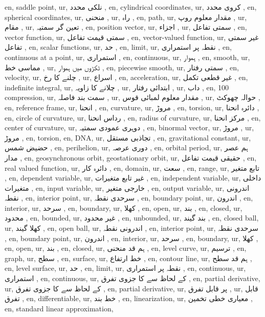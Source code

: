 en, saddle point,
ur, نلکی محدد ,
en, cylindrical coordinates,
ur, کروی محدد ,
en, spherical coordinates,
ur, منحنی ,
ur, راہ ,
en, path,
ur, مقدار معلوم روپ  ,
ur,  مقام ,
ur,  تعین گر سمتیہ ,
en, position vector,
ur,  اجزاء ,
ur, سمتی تفاعل ,
en, vector function,
ur, سمتی قیمت تفاعل ,
en, vector-valued function,
ur, غیر سمتی تفاعل ,
en, scalar functions,
ur, حد ,
en, limit,
ur,  نقطہ پر استمراری ,
en, continuous at a point,
ur, استمراری ,
en, continuous,
ur, ہموار ,
en, smooth,
ur, مماسی خط ,
ur, ٹکڑوں میں ہموار ,
en, piecewise smooth,
ur, سمتی رفتار ,
en, velocity,
ur, چلنے کا رخ ,
ur, اسراع ,
en, acceleration,
ur, غیر قطعی تکمل ,
en, indefinite integral,
ur, چلانے کا زاویہ ,
ur, ابتدائی رفتار ,
ur,  داب ,
en, 100 compression,
ur, سمت بند فاصلہ ,
ur, مقدار معلوم لمبائی قوس ,
ur, حوالہ چھوکٹ ,
en, reference frame,
ur,  انحنا ,
en, curvature,
ur, مروڑ ,
en, torsion,
ur, دائرہ انحنا ,
en, circle of curvature,
ur,  رداس انحنا ,
en, radius of curvature,
ur, مرکز انحنا ,
en, center of curvature,
ur, دوہری عمودی سمتیہ ,
en, binormal vector,
ur, مروڑ ,
ur, مروڑ ,
en, torsion,
en, DNA,
ur, تجاذبی مستقل ,
en, gravitational constant,
ur, حضیض شمس ,
en, perihelion,
ur, دوری عرصہ  ,
en, orbital period,
ur, ہم عصر مدار ,
en, geosynchronous orbit, geostationary orbit,
ur, حقیقی قیمت تفاعل ,
en, real valued function,
ur, دائرہ کار ,
en, domain,
ur, سعت ,
en, range,
ur, تابع متغیر ,
en, dependent variable,
ur, غیر تابع متغیرات ,
en, independent variable,
ur, داخلی متغیرات ,
en, input variable,
ur, خارجی متغیر ,
en, output variable,
ur, اندرونی نقطہ ,
en, interior point,
ur, سرحدی نقطہ ,
en, boundary point,
ur,  اندرون ,
en, interior,
ur, سرحد ,
en, boundary,
ur, کھلا ,
en, open,
ur, بند ,
en, closed,
ur, محدود ,
en, bounded,
ur, غیر محدود ,
en, unbounded,
ur, بند گیند ,
en, closed ball,
ur, کھلا گیند ,
en, open ball,
ur, اندرونی نقطہ ,
en, interior point,
ur, سرحدی نقطہ ,
en, boundary point,
ur, اندرون ,
en, interior,
ur, سرحد ,
en, boundary,
ur, کھلا ,
en, open,
ur,  بند ,
en, closed,
ur, ہم قد منحنی ,
en, level curve,
ur, ترسیم ,
en, graph,
ur, سطح ,
en, surface,
ur,  خط ارتفاع ,
en, contour line,
ur,  ہم قد سطح ,
en, level surface,
ur, حد ,
en, limit,
ur, نقطہ  پر استمراری ,
en, continuous,
ur,  استمراری ,
en, continuous,
ur,   کے لحاظ سے  کا جزوی تفرق ,
en, partial derivative,
ur,   کے لحاظ سے  کا جزوی تفرق ,
en, partial derivative,
ur,  پر  قابل تفرق ,
ur,  قابل تفرق ,
en, differentiable,
ur,  خط بند ,
en, linearization,
ur, معیاری خطی تخمین ,
en, standard linear approximation,
